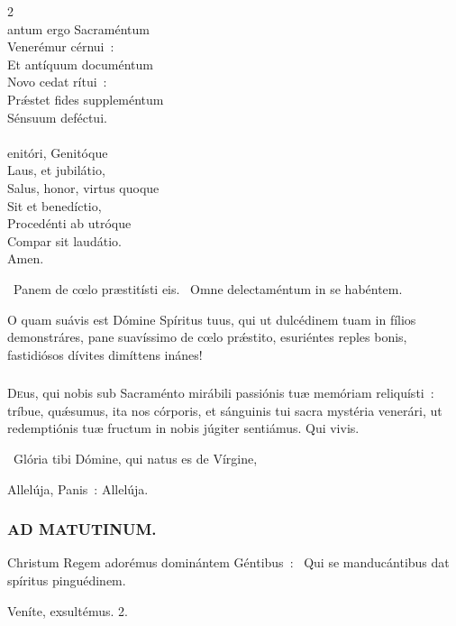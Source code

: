 \documentclass[9pt,twoside]{extarticle}
\begin{document}
\begin{multicols}{2}
\\
antum ergo Sacraméntum\\ 
Venerémur cérnui~:\\ 
Et antíquum documéntum\\ 
Novo cedat rítui~:\\ 
Prǽstet fides suppleméntum\\ 
Sénsuum deféctui.\\
\\
enitóri, Genitóque\\ 
Laus, et jubilátio,\\ 
Salus, honor, virtus quoque\\ 
Sit et benedíctio,\\ 
Procedénti ab utróque\\ 
Compar sit laudátio.\\
Amen.

\begin{tightlist}{}
\item {}~Panem de cœlo præstitísti eis. ~Omne delectaméntum in se habéntem.
\item {} O quam suávis est Dómine Spíritus tuus, qui ut dulcédinem tuam in fílios demonstráres, pane suavíssimo de cœlo prǽstito, esuriéntes reples bonis, fastidiósos dívites dimíttens inánes!
\end{tightlist}
\subsubsection*{\center {}}
\lettrine{D}eus, qui nobis sub Sacraménto mirábili passiónis tuæ memóriam reliquísti~: tríbue, quǽsumus, ita nos córporis, et sánguinis tui sacra mystéria venerári, ut redemptiónis tuæ fructum in nobis júgiter sentiámus. Qui vivis.

\begin{tightlist}{}
\item {}~Glória tibi Dómine, qui natus es de Vírgine, 
\item {} Allelúja, Panis~:  Allelúja.
\end{tightlist}

\subsubsection*{\center \textsc{AD MATUTINUM.}}
\begin{tightlist}{}
\item {} Christum Regem adorémus dominántem Géntibus~: \textred{*}~Qui se manducántibus dat spíritus pinguédinem.
\item {} Veníte, exsultémus. 2.
\end{tightlist}


\end{multicols}
\end{document}
